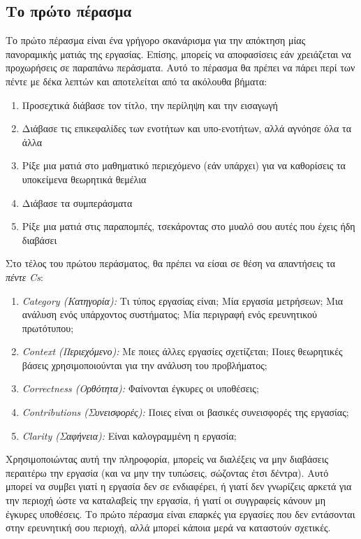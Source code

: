\documentclass{article}
\begin{document}
\subsection{Το πρώτο πέρασμα}
\par
Το πρώτο πέρασμα είναι ένα γρήγορο σκανάρισμα για την απόκτηση μίας πανοραμικής ματιάς της εργασίας. Επίσης, μπορείς να αποφασίσεις εάν χρειάζεται να προχωρήσεις σε παραπάνω περάσματα. Αυτό το πέρασμα θα πρέπει να πάρει περί των πέντε με δέκα λεπτών και αποτελείται από τα ακόλουθα βήματα:
\begin{enumerate}
    \item Προσεχτικά διάβασε τον τίτλο, την περίληψη και την εισαγωγή
    \item Διάβασε τις επικεφαλίδες των ενοτήτων και υπο-ενοτήτων, αλλά αγνόησε όλα τα άλλα
    \item Ρίξε μια ματιά στο μαθηματικό περιεχόμενο (εάν υπάρχει) για να καθορίσεις τα υποκείμενα θεωρητικά θεμέλια
    \item Διάβασε τα συμπεράσματα
    \item Ρίξε μια ματιά στις παραπομπές, τσεκάροντας στο μυαλό σου αυτές που έχεις ήδη διαβάσει
\end{enumerate}
\par
Στο τέλος του πρώτου περάσματος, θα πρέπει να είσαι σε θέση να απαντήσεις τα \textit{πέντε \textlatin{Cs}}:
\begin{enumerate}
    \item \textit{\textlatin{Category} (Κατηγορία):} Τι τύπος εργασίας είναι\textlatin{;} Μία εργασία μετρήσεων\textlatin{;} Μια ανάλυση ενός υπάρχοντος συστήματος\textlatin{;} Μία περιγραφή ενός ερευνητικού πρωτότυπου\textlatin{;}
    \item \textit{\textlatin{Context} (Περιεχόμενο):} Με ποιες άλλες εργασίες σχετίζεται\textlatin{;} Ποιες θεωρητικές βάσεις χρησιμοποιούνται για την ανάλυση του προβλήματος\textlatin{;}
    \item \textit{\textlatin{Correctness} (Ορθότητα):} Φαίνονται έγκυρες οι υποθέσεις\textlatin{;}
    \item \textit{\textlatin{Contributions} (Συνεισφορές):} Ποιες είναι οι βασικές συνεισφορές της εργασίας\textlatin{;}
    \item \textit{\textlatin{Clarity} (Σαφήνεια):} Είναι καλογραμμένη η εργασία\textlatin{;}
\end{enumerate}
\par
Χρησιμοποιώντας αυτή την πληροφορία, μπορείς να διαλέξεις να μην διαβάσεις περαιτέρω την εργασία (και να μην την τυπώσεις, σώζοντας έτσι δέντρα). Αυτό μπορεί να συμβει γιατί η εργασία δεν σε ενδιαφέρει, ή γιατί δεν γνωρίζεις αρκετά για την περιοχή ώστε να καταλαβείς την εργασία, ή γιατί οι συγγραφείς κάνουν μη έγκυρες υποθέσεις. Το πρώτο πέρασμα είναι επαρκές για εργασίες που δεν εντάσονται στην ερευνητική σου περιοχή, αλλά μπορεί κάποια μερά να καταστούν σχετικές.
\end{document}
